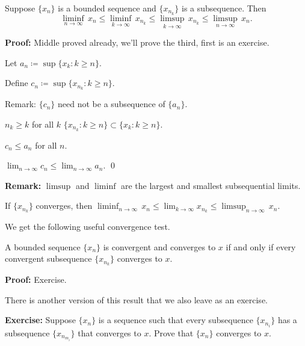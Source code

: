 \documentclass[10pt,aspectratio=149]{beamer}
\begin{document}
\begin{frame}
\begin{proposition}
Suppose $\{ x_n \}$ is a bounded sequence and
$\{ x_{n_k} \}$ is a subsequence.  Then
\begin{equation*}
\liminf_{n\to\infty} \, x_n \leq
\liminf_{k\to\infty} \, x_{n_k} \leq
\limsup_{k\to\infty} \, x_{n_k} \leq
\limsup_{n\to\infty} \, x_n .
\end{equation*}
\end{proposition}

\pause
\textbf{Proof:}
Middle proved already, we'll prove the third, first is an exercise.

\pause
\medskip

Let $a_n \coloneqq \sup \{ x_k : k \geq n \}$.

\pause
\medskip

Define $c_n \coloneqq \sup \{ x_{n_k} : k \geq n \}$.

\pause
\medskip

Remark: $\{ c_n \}$ need not be a subsequence of $\{ a_n \}$.

\pause
\medskip

$n_k \geq k$ for all $k$ \wthus $\{ x_{n_k} : k \geq n \} \subset \{ x_k : k \geq n \}$.

\pause
\medskip

\thus \quad $c_n \leq a_n$ \quad for all $n$.

\pause
\medskip

\thus \quad
$\displaystyle \lim_{n\to\infty} c_n \leq \lim_{n\to\infty} a_n$.
\qed

\pause
\medskip

\textbf{Remark:}
$\limsup$ and $\liminf$ are the 
largest and smallest subsequential limits.

\pause
If $\{ x_{n_k} \}$ converges, then
\quad
$\displaystyle \liminf_{n\to\infty} \, x_n \leq
\lim_{k\to\infty} x_{n_k} \leq
\limsup_{n\to\infty} \, x_n$.

\end{frame}

\begin{frame}

We get the following useful convergence test.

\begin{proposition}
A bounded sequence $\{ x_n \}$ is convergent and converges to $x$
if and only if
every convergent subsequence
$\{ x_{n_k} \}$ converges to $x$.
\end{proposition}

\pause
\textbf{Proof:} Exercise.

\pause
\medskip

There is another version of this result that we also leave as an exercise.

\medskip

\textbf{Exercise:}
Suppose $\{ x_n \}$ is a sequence such that every subsequence $\{
x_{n_i} \}$ has a subsequence
$\{ x_{n_{m_i}} \}$ that converges to $x$.
Prove that $\{ x_n \}$ converges to $x$.

\end{frame}
\end{document}
